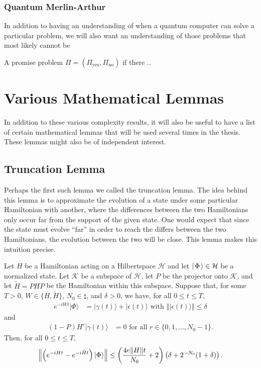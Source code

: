 \documentclass[../thesis-main/thesis-main]{subfiles}
\begin{document}
\subsubsection{Quantum Merlin-Arthur}

In addition to having an understanding of when a quantum computer can solve a particular problem, we will also want an understanding of those problems that most likely cannot be 


\begin{definition}[\QMA]  A promise problem $\Pi = (\Pi_{\text{yes}},\Pi_{\text{no}})$ if there ..

\end{definition}


\section{Various Mathematical Lemmas}

In addition to these various complexity results, it will also be useful to have a list of certain mathematical lemmas that will be used several times in the thesis.  These lemmas might also be of independent interest.

\subsection{Truncation Lemma}

Perhaps the first such lemma we called the truncation lemma.  The idea behind this lemma is to approximate the evolution of a state under some particular Hamiltonian with another, where the differences between the two Hamiltonians only occur far from the support of the given state.  One would expect that since the state must evolve ``far'' in order to reach the differs between the two Hamiltonians, the evolution between the two will be close.  This lemma makes this intuition precise.

\begin{lemma}
\label{lem:trunc}
Let $H$ be a Hamiltonian acting on a Hilbertspace $\mathcal{H}$ and let $|\mspace{2mu} \Phi \mspace{2mu} \rangle\in\mathcal{H}$ be a normalized state. Let
$\mathcal{K}$ be a subspace of $\mathcal{H}$, let $P$ be the projector onto $\mathcal{K}$,
and let $\tilde{H}=PHP$ be the Hamiltonian within this subspace. Suppose
that, for some $T>0$, $W\in\{H,\tilde{H}\}$, $N_0\in\natural$,
and $\delta>0$, we have, for all $0\leq t\leq T$, 
\begin{align*}
e^{-iWt}|\Phi\rangle & = |\gamma(t)\rangle+|\epsilon(t)\rangle \text{ with }
\left\Vert |\epsilon(t)\rangle\right\Vert \leq \delta
\end{align*}
and
\begin{align*}
  (1-P) H^{r}|\gamma(t)\rangle & = 0 \text{ for all } r\in\{0,1,\ldots, N_0-1\}.
\end{align*}
Then, for all $0\leq t \leq T$, 
\[
  \left\|{\left(e^{-iHt}-e^{-i\tilde{H}t}\right)|\Phi\rangle}\right\|
  \leq \left(\frac{4e\|{H}\|t}{N_0} + 2 \right) 
        \left(\delta + 2^{-N_0}(1+\delta)\right).
\]
\end{lemma}
\end{document}
